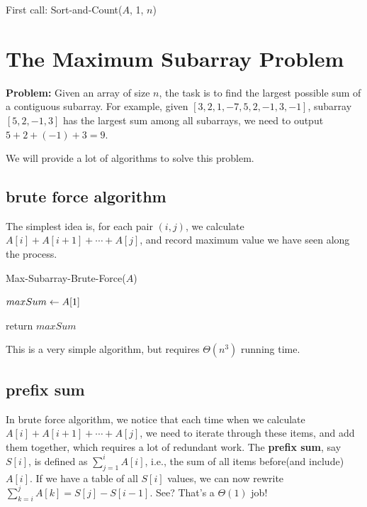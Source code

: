 \documentclass[11pt, a4paper]{COMP3711}
\begin{document}
\begin{spacing}{1.5}
    First call: Sort-and-Count($A$, 1, $n$)

    \section{The Maximum Subarray Problem}

    {\bf Problem:} Given an array of size $n$, the task is
    to find the largest possible sum of a contiguous subarray.
    For example, given $[3,2,1,-7,5,2,-1,3,-1]$, 
    subarray $[5,2,-1,3]$ has the largest sum among all subarrays,
    we need to output $5+2+(-1)+3=9$.

    We will provide a lot of algorithms to solve this problem.

    \subsection{brute force algorithm}

    The simplest idea is, for each pair $(i,j)$, we calculate
    $A[i]+A[i+1]+\cdots+A[j]$, and record maximum value 
    we have seen along the process.

    \begin{algorithm}
        \caption{Max-Subarray-Brute-Force($A$)}
        $maxSum \leftarrow A[1]$ \qquad {}

        return $maxSum$
    \end{algorithm}

    This is a very simple algorithm, but requires $\Theta(n^3)$ running time.

    \subsection{prefix sum}

    In brute force algorithm, we notice that each time when we 
    calculate $A[i]+A[i+1]+\cdots+A[j]$, we need to iterate through 
    these items, and add them together, which requires a lot of 
    redundant work. The {\bf prefix sum}, say $S[i]$, is defined 
    as $\sum_{j=1}^{i} A[i]$, i.e., the sum of all items before(and include)
    $A[i]$. If we have a table of all $S[i]$ values, we can now rewrite 
    $\sum_{k=i}^{j} A[k]=S[j]-S[i-1]$. See? That's a $\Theta(1)$ job!


\end{spacing}
\end{document}
